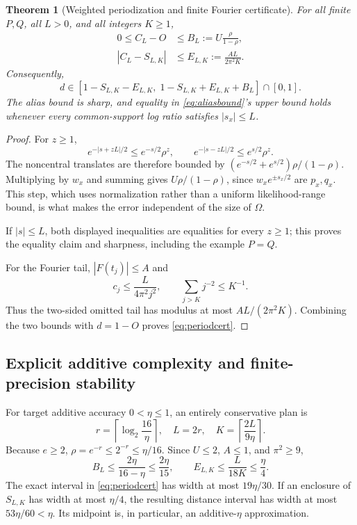 \documentclass[11pt]{article}
\newtheorem{theorem}{Theorem}[section]
\theoremstyle{definition}
\theoremstyle{remark}
\begin{document}
\begin{theorem}[Weighted periodization and finite Fourier certificate]
\label{thm:periodic}
For all finite $P,Q$, all $L>0$, and all integers $K\ge1$,
\begin{align}
 0\le C_L-O&\le B_L:=U\frac{\rho}{1-\rho},
 \label{eq:aliasbound}\\
 |C_L-S_{L,K}|&\le E_{L,K}:=\frac{AL}{2\pi^2K}.
 \label{eq:periodtail}
\end{align}
Consequently,
\begin{equation}
 d\in[1-S_{L,K}-E_{L,K},\;1-S_{L,K}+E_{L,K}+B_L]\cap[0,1].
 \label{eq:periodcert}
\end{equation}
The alias bound is sharp, and equality in \eqref{eq:aliasbound}'s upper bound holds whenever every common-support log ratio satisfies $|s_x|\le L$.
\end{theorem}
\begin{proof}
For $z\ge1$,
\[
 e^{-|s+zL|/2}\le e^{-s/2}\rho^z,
 \qquad
 e^{-|s-zL|/2}\le e^{s/2}\rho^z.
\]
The noncentral translates are therefore bounded by
$(e^{-s/2}+e^{s/2})\rho/(1-\rho)$. Multiplying by $w_x$ and summing gives $U\rho/(1-\rho)$, since $w_xe^{\pm s_x/2}$ are $p_x,q_x$. This step, which uses normalization rather than a uniform likelihood-range bound, is what makes the error independent of the size of $\Omega$.

If $|s|\le L$, both displayed inequalities are equalities for every $z\ge1$; this proves the equality claim and sharpness, including the example $P=Q$.

For the Fourier tail, $|F(t_j)|\le A$ and
\[
 c_j\le\frac{L}{4\pi^2j^2},\qquad
 \sum_{j>K}j^{-2}\le K^{-1}.
\]
Thus the two-sided omitted tail has modulus at most $AL/(2\pi^2K)$. Combining the two bounds with $d=1-O$ proves \eqref{eq:periodcert}.
\end{proof}

\subsection{Explicit additive complexity and finite-precision stability}

For target additive accuracy $0<\eta\le1$, an entirely conservative plan is
\begin{equation}
 r=\left\lceil\log_2\frac{16}{\eta}\right\rceil,
 \quad L=2r,
 \quad K=\left\lceil\frac{2L}{9\eta}\right\rceil.
 \label{eq:addplan}
\end{equation}
Because $e\ge2$, $\rho=e^{-r}\le2^{-r}\le\eta/16$. Since $U\le2$, $A\le1$, and $\pi^2\ge9$,
\begin{equation}
 B_L\le\frac{2\eta}{16-\eta}\le\frac{2\eta}{15},
 \qquad E_{L,K}\le\frac{L}{18K}\le\frac\eta4.
 \label{eq:addbudget}
\end{equation}
The exact interval in \eqref{eq:periodcert} has width at most $19\eta/30$. If an enclosure of $S_{L,K}$ has width at most $\eta/4$, the resulting distance interval has width at most $53\eta/60<\eta$. Its midpoint is, in particular, an additive-$\eta$ approximation.
\end{document}

